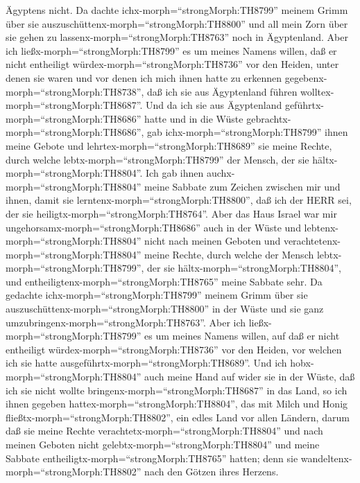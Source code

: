 Ägyptens nicht. Da dachte ichx-morph=``strongMorph:TH8799'' meinem Grimm
über sie auszuschüttenx-morph=``strongMorph:TH8800'' und all mein Zorn
über sie gehen zu lassenx-morph=``strongMorph:TH8763'' noch in
Ägyptenland.  Aber ich ließx-morph=``strongMorph:TH8799'' es
um meines Namens willen, daß er nicht entheiligt
würdex-morph=``strongMorph:TH8736'' vor den Heiden, unter denen sie
waren und vor denen ich mich ihnen hatte zu erkennen
gegebenx-morph=``strongMorph:TH8738'', daß ich sie aus Ägyptenland
führen wolltex-morph=``strongMorph:TH8687''.  Und da ich
sie aus Ägyptenland geführtx-morph=``strongMorph:TH8686'' hatte und in
die Wüste gebrachtx-morph=``strongMorph:TH8686'',  gab
ichx-morph=``strongMorph:TH8799'' ihnen meine Gebote und
lehrtex-morph=``strongMorph:TH8689'' sie meine Rechte, durch welche
lebtx-morph=``strongMorph:TH8799'' der Mensch, der sie
hältx-morph=``strongMorph:TH8804''.  Ich gab ihnen
auchx-morph=``strongMorph:TH8804'' meine Sabbate zum Zeichen zwischen
mir und ihnen, damit sie lerntenx-morph=``strongMorph:TH8800'', daß ich
der HERR sei, der sie heiligtx-morph=``strongMorph:TH8764''.
 Aber das Haus Israel war mir
ungehorsamx-morph=``strongMorph:TH8686'' auch in der Wüste und
lebtenx-morph=``strongMorph:TH8804'' nicht nach meinen Geboten und
verachtetenx-morph=``strongMorph:TH8804'' meine Rechte, durch welche der
Mensch lebtx-morph=``strongMorph:TH8799'', der sie
hältx-morph=``strongMorph:TH8804'', und
entheiligtenx-morph=``strongMorph:TH8765'' meine Sabbate sehr. Da
gedachte ichx-morph=``strongMorph:TH8799'' meinem Grimm über sie
auszuschüttenx-morph=``strongMorph:TH8800'' in der Wüste und sie ganz
umzubringenx-morph=``strongMorph:TH8763''.  Aber ich
ließx-morph=``strongMorph:TH8799'' es um meines Namens willen, auf daß
er nicht entheiligt würdex-morph=``strongMorph:TH8736'' vor den Heiden,
vor welchen ich sie hatte ausgeführtx-morph=``strongMorph:TH8689''.
 Und ich hobx-morph=``strongMorph:TH8804'' auch meine Hand
auf wider sie in der Wüste, daß ich sie nicht wollte
bringenx-morph=``strongMorph:TH8687'' in das Land, so ich ihnen gegeben
hattex-morph=``strongMorph:TH8804'', das mit Milch und Honig
fließtx-morph=``strongMorph:TH8802'', ein edles Land vor allen Ländern,
 darum daß sie meine Rechte
verachtetx-morph=``strongMorph:TH8804'' und nach meinen Geboten nicht
gelebtx-morph=``strongMorph:TH8804'' und meine Sabbate
entheiligtx-morph=``strongMorph:TH8765'' hatten; denn sie
wandeltenx-morph=``strongMorph:TH8802'' nach den Götzen ihres Herzens.
